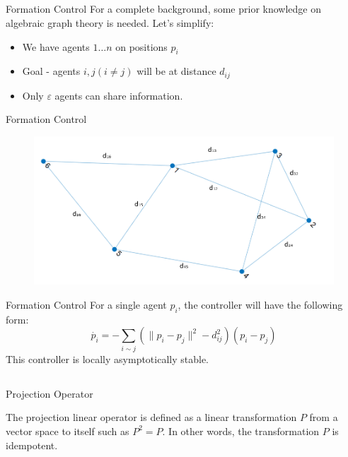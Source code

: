 \documentclass[t]{beamer}
\newcommand{\norm}[1]{\lVert #1 \rVert}
\begin{document}
\subsection[Distance-Based Formation Control]{}
\begin{frame}[label=distanceformation1]{Formation Control}
For a complete background, some prior knowledge on algebraic graph theory is needed. Let's simplify:
\begin{itemize}
\item We have agents $1 \ldots n$ on positions $p_{i}$ \pause
\item Goal - agents $i,j (i \neq j)$ will be at distance $d_{ij}$ \pause
\item Only $\varepsilon$ agents can share information.
\end{itemize}
\end{frame}

\begin{frame}[label=distanceformation2]{Formation Control}
\begin{figure}[t!]
\centering
\includegraphics[scale=0.42]{graph-example.png}
\end{figure}
\end{frame}

\begin{frame}[label=distanceformation3]{Formation Control}
For a single agent $p_i$, the controller will have the following form:
\begin{equation}
    \dot{p_{i}} = -\sum_{i \sim j} \left( \norm{p_{i} - p_{j}}^{2} - d_{ij}^2 \right) \left( p_{i} - p_{j} \right)
    \label{formation controller}
\end{equation}
This controller is locally asymptotically stable.
\end{frame}

\subsection[Projection Operator]{}
\begin{frame}[label=projoperator]{Projection Operator}

The projection linear operator is defined as a linear transformation $P$ from a vector space to itself such as $P^2 = P$. In other words, the transformation $P$ is idempotent.

\end{frame}
\end{document}
